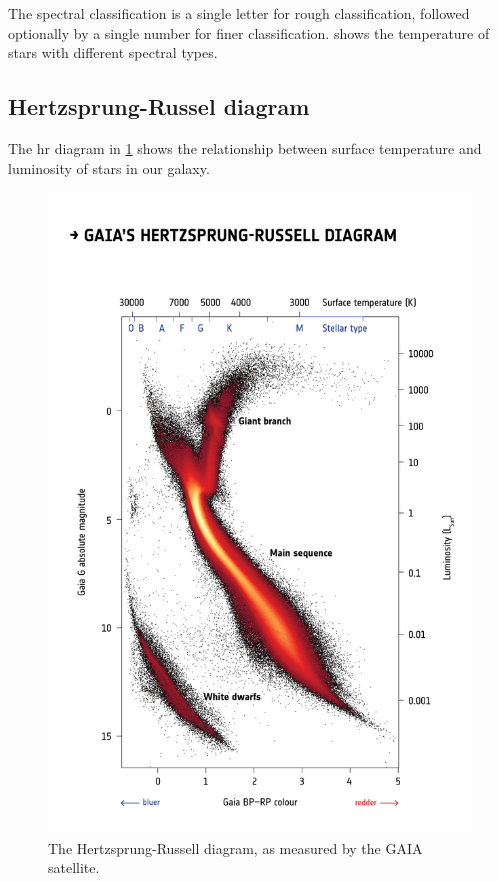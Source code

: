 The spectral classification is a single letter for rough classification, followed optionally by a single number for finer classification.
 shows the temperature of stars with different spectral types.

\subsection{Hertzsprung-Russel diagram}

The \ac{hr} diagram in \cref{fig:hr-gaia} shows the relationship between surface temperature and luminosity of stars in our galaxy.

\begin{figure}
	\includegraphics[width=\textwidth]{img/ch-05/hr-gaia.png}
	\caption{The Hertzsprung-Russell diagram, as measured by the GAIA satellite.}
	\label{fig:hr-gaia}
\end{figure}

